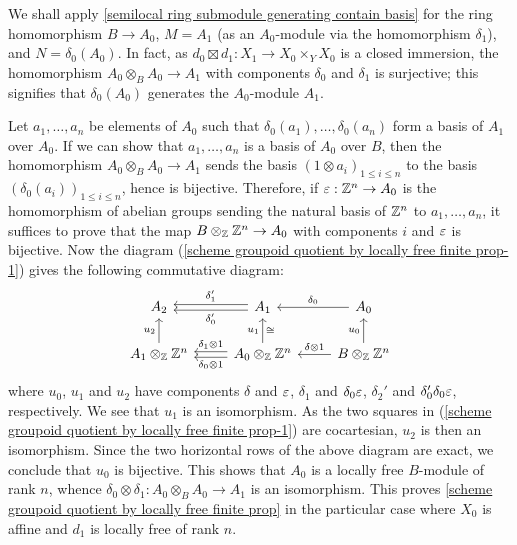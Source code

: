 We shall apply \cref{semilocal ring submodule generating contain basis} for the ring homomorphism $B\to A_0$, $M=A_1$ (as an $A_0$-module via the homomorphism $\delta_1$), and $N=\delta_0(A_0)$. In fact, as $d_0\boxtimes d_1:X_1\to X_0\times_YX_0$ is a closed immersion, the homomorphism $A_0\otimes_BA_0\to A_1$ with components $\delta_0$ and $\delta_1$ is surjective; this signifies that $\delta_0(A_0)$ generates the $A_0$-module $A_1$.\par
Let $a_1,\dots,a_n$ be elements of $A_0$ such that $\delta_0(a_1),\dots,\delta_0(a_n)$ form a basis of $A_1$ over $A_0$. If we can show that $a_1,\dots,a_n$ is a basis of $A_0$ over $B$, then the homomorphism $A_0\otimes_BA_0\to A_1$ sends the basis $(1\otimes a_i)_{1\leq i\leq n}$ to the basis $(\delta_0(a_i))_{1\leq i\leq n}$, hence is bijective. Therefore, if $\varepsilon:\mathbb{Z}^n\to A_0$ is the homomorphism of abelian groups sending the natural basis of $\mathbb{Z}^n$ to $a_1,\dots,a_n$, it suffices to prove that the map $B\otimes_{\mathbb{Z}}\mathbb{Z}^n\to A_0$ with components $i$ and $\varepsilon$ is bijective. Now the diagram (\ref{scheme groupoid quotient by locally free finite prop-1}) gives the following commutative diagram:
\[\begin{tikzcd}
A_2&A_1\ar[l,shift left=2pt,"\delta_0'"]\ar[l,shift right=2pt,swap,"\delta_1'"]&A_0\ar[l,swap,"\delta_0"]\\
A_1\otimes_{\Z}\Z^n\ar[u,"u_2"]&A_0\otimes_{\Z}\Z^n\ar[l,shift left=2pt,"\delta_0\otimes 1"]\ar[l,shift right=2pt,swap,"\delta_1\otimes 1"]\ar[u,"u_1","\cong"']&B\otimes_{\Z}\Z^n\ar[l,swap,"\delta\otimes 1"]\ar[u,"u_0"]
\end{tikzcd}\]
where $u_0$, $u_1$ and $u_2$ have components $\delta$ and $\varepsilon$, $\delta_1$ and $\delta_0\varepsilon$, $\delta_2'$ and $\delta_0'\delta_0\varepsilon$, respectively. We see that $u_1$ is an isomorphism. As the two squares in (\ref{scheme groupoid quotient by locally free finite prop-1}) are cocartesian, $u_2$ is then an isomorphism. Since the two horizontal rows of the above diagram are exact, we conclude that $u_0$ is bijective. This shows that $A_0$ is a locally free $B$-module of rank $n$, whence $\delta_0\otimes\delta_1:A_0\otimes_BA_0\to A_1$ is an isomorphism. This proves \cref{scheme groupoid quotient by locally free finite prop} in the particular case where $X_0$ is affine and $d_1$ is locally free of rank $n$.

